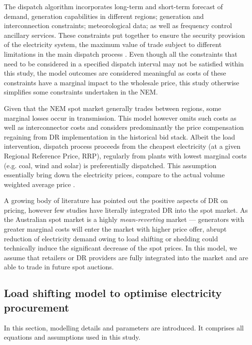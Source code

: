 \documentclass{pasa}%
\begin{document}
The dispatch algorithm incorporates long-term and short-term forecast of demand, generation capabilities in different regions; generation and interconnection constraints; meteorological data; as well as frequency control ancillary services. These constraints put together to ensure the security provision of the electricity system, the maximum value of trade subject to different limitations in the main dispatch process \cite{aemo2019}. Even though all the constraints that need to be considered in a specified dispatch interval may not be satisfied within this study, the model outcomes are considered meaningful as costs of these constraints have a marginal impact to the wholesale price, this study otherwise simplifies some constraints undertaken in the NEM.

Given that the NEM spot market generally trades between regions, some marginal losses occur in transmission. This model however omits such costs as well as interconnector costs and considers predominantly the price compensation regaining from DR implementation in the historical bid stack. Albeit the load intervention, dispatch process proceeds from the cheapest electricity (at a given Regional Reference Price, RRP), regularly from plants with lowest marginal costs (e.g. coal, wind and solar) is preferentially dispatched. This assumption essentially bring down the electricity prices, compare to the actual volume weighted average price \cite{aemoloss2019}. 


A growing body of literature has pointed out the positive aspects of DR on pricing, however few studies have literally integrated DR into the spot market. As the Australian spot market is a highly \textit{mean-reverting} market --- generators with greater marginal costs will enter the market with higher price offer, abrupt reduction of electricity demand owing to load shifting or shedding could technically induce the significant decrease of the spot prices. In this model, we assume that retailers or DR providers are fully integrated into the market and are  able to trade in future spot auctions.  

\subsection{Load shifting model to optimise electricity procurement}
\label{sec:model4.3}

In this section, modelling details and parameters are introduced. It comprises all equations and assumptions used in this study. 
\end{document}
